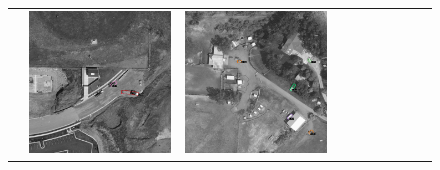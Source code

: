 \begin{figure}[h!]
\begin{tabularx}{\textwidth}{c|*{9}{X}}
    & \includegraphics[trim={440pt 360pt 460pt 555pt},clip,width=\linewidth]{images/015Results/03ablation/comp_images/blue/427.png}
    & \includegraphics[trim={740pt 420pt 180pt 510pt},clip,width=\linewidth]{images/015Results/03ablation/comp_images/blue/523.png}

\end{tabularx}
\end{figure}
